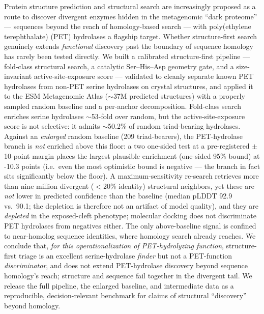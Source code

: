 Protein structure prediction and structural search are increasingly proposed as a
route to discover divergent enzymes hidden in the metagenomic ``dark proteome'' ---
sequences beyond the reach of homology-based search --- with poly(ethylene
terephthalate) (PET) hydrolases a flagship target. Whether structure-first search
genuinely extends \emph{functional} discovery past the boundary of sequence homology
has rarely been tested directly. We built a calibrated structure-first pipeline ---
fold-class structural search, a catalytic Ser--His--Asp geometry gate, and a
size-invariant active-site-exposure score --- validated to cleanly separate known
PET hydrolases from non-PET serine hydrolases on crystal structures, and applied it
to the ESM Metagenomic Atlas ($\sim$37M predicted structures) with a properly
sampled random baseline and a per-anchor decomposition. Fold-class search enriches
serine hydrolases $\sim$53-fold over random, but the active-site-exposure
score is not selective: it admits $\sim$50.2\% of random triad-bearing
hydrolases. Against an \emph{enlarged} random baseline (209 triad-bearers),
the PET-hydrolase branch is \emph{not} enriched above this floor: a two one-sided
test at a pre-registered $\pm$10-point margin places the largest plausible
enrichment (one-sided 95\% bound) at -10.3 points
(i.e.\ even the most optimistic bound is negative --- the branch in fact sits significantly below the floor). A maximum-sensitivity re-search retrieves more than nine
million divergent ($<$20\% identity) structural neighbors, yet these are \emph{not}
lower in predicted confidence than the baseline (median pLDDT 92.9 vs.\
90.1; the depletion is therefore not an artifact of model quality), and
they are \emph{depleted} in the exposed-cleft phenotype; molecular docking does not
discriminate PET hydrolases from negatives either. The only above-baseline signal is
confined to near-homolog sequence identities, where homology search already reaches.
We conclude that, \emph{for this operationalization of PET-hydrolyzing function},
structure-first triage is an excellent serine-hydrolase \emph{finder} but not a
PET-function \emph{discriminator}, and does not extend PET-hydrolase discovery beyond
sequence homology's reach; structure and sequence fail together in the divergent
tail. We release the full pipeline, the enlarged baseline, and intermediate data as a
reproducible, decision-relevant benchmark for claims of structural ``discovery''
beyond homology.


